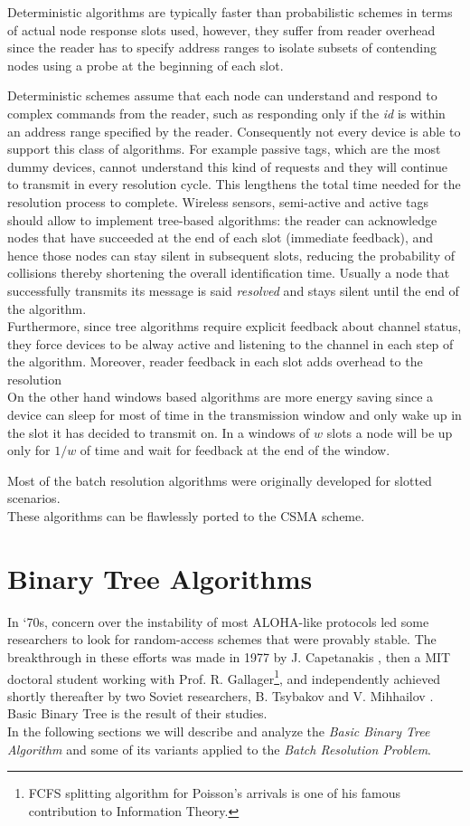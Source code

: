 \documentclass[12pt,a4paper]{report}
\newcommand{\rev}[1]{\textcolor{Cerulean}{#1}}
\begin{document}
Deterministic algorithms are typically faster than probabilistic schemes in terms of actual node response slots used, however, they suffer from reader overhead since the reader has to specify address ranges to isolate  subsets of contending nodes using a probe at the beginning of each slot.

Deterministic schemes assume that each node can understand and respond to complex commands from the reader, such as responding only if the \emph{id} is within an address range specified by the reader. Consequently not every device is able to support this class of algorithms. For example passive tags, which are the most dummy devices, cannot understand this kind of requests and they will continue to transmit in every resolution cycle. This lengthens the total time needed for the resolution process to complete. Wireless sensors, semi-active and active tags should allow to implement tree-based algorithms: the reader can acknowledge nodes that have succeeded at the end of each slot (immediate feedback), and hence those nodes can stay silent in subsequent slots, reducing the probability of collisions thereby shortening the overall identification time. Usually a node that successfully transmits its message is said \emph{resolved} and stays silent until the end of the algorithm.\\
Furthermore, since tree algorithms require explicit feedback about channel status, they force devices to be alway active and listening to the channel in each step of the algorithm. 
\rev{Moreover, reader feedback in each slot adds overhead to the resolution}\\
On the other hand windows based algorithms are more energy saving since a device can sleep for most of time in the transmission window and only wake up in the slot it has decided to transmit on. In a windows of $w$ slots  a node will be up only for $1/w$ of time and wait for feedback at the end of the window.


Most of the batch resolution algorithms  were originally developed for slotted scenarios.\\
These algorithms can be flawlessly ported to the CSMA scheme.
 
\section{Binary Tree Algorithms}
In `70s, concern over the instability of most ALOHA-like protocols led some researchers to look for random-access schemes that were provably stable. The breakthrough in these efforts was made in 1977 by J.  Capetanakis  \cite{capetanakis77}, then a MIT doctoral student working with Prof. R. Gallager\footnote{FCFS splitting algorithm for Poisson's arrivals is one of his famous contribution to Information Theory.}, and independently achieved shortly thereafter by two Soviet researchers, B. Tsybakov and V. Mihhailov \cite{tsybakov}. Basic Binary Tree is the result of their studies.\\
In the following sections we will describe and analyze the \emph{Basic Binary Tree Algorithm} and some of its variants applied to the \emph{Batch Resolution Problem}.
\end{document}
